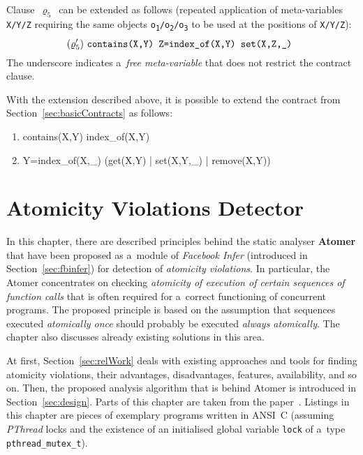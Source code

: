 Clause~$ \varrho_5 $~can be extended as follows (repeated application of
meta-variables \texttt{X/Y/Z} requiring the same objects
\texttt{o\textsubscript{1}/o\textsubscript{2}/o\textsubscript{3}} to be used
at the positions of \texttt{X/Y/Z}):
$$
    (\varrho'_5)\ \text{\texttt{%
        contains(X,Y) Z=index\_of(X,Y) set(X,Z,\_)
    }}
$$
The underscore indicates a~\emph{free meta-variable} that does not restrict
the contract clause.

With the extension described above, it is possible to extend the contract
from Section~\ref{sec:basicContracts} as follows:
\begin{enumerate}[label={$ (\varrho'_{\arabic*}) $}]
    \tt

    \item contains(X,Y) index\_of(X,Y)
    \item Y=index\_of(X,\_) (get(X,Y) | set(X,Y,\_) | remove(X,Y))
\end{enumerate}



\chapter{Atomicity Violations Detector}
\label{chap:proposal}

In this chapter, there are described principles behind the static analyser
\textbf{Atomer} that have been proposed as a~module of \emph{Facebook
Infer} (introduced in Section~\ref{sec:fbinfer}) for detection of
\emph{atomicity violations}. In particular, the Atomer concentrates on 
checking \emph{atomicity of execution of certain sequences of function 
calls} that is often required for a~correct functioning of concurrent 
programs. The proposed principle is based on the assumption that sequences
executed \emph{atomically once} should probably be executed \emph{always
atomically}. The chapter also discusses already existing solutions in this
area.

At first, Section~\ref{sec:relWork} deals with
existing approaches and tools for finding atomicity violations, their
advantages, disadvantages, features, availability, and so on. Then,
the proposed analysis algorithm that is behind Atomer is introduced in
Section~\ref{sec:design}. Parts of this chapter are taken from the
paper~\cite{excel2019FBInfer}. Listings in this chapter are pieces of 
exemplary programs written in ANSI~C (assuming \emph{PThread} locks and the
existence of an initialised global variable \texttt{lock} of a~type
\texttt{pthread\_mutex\_t}).


